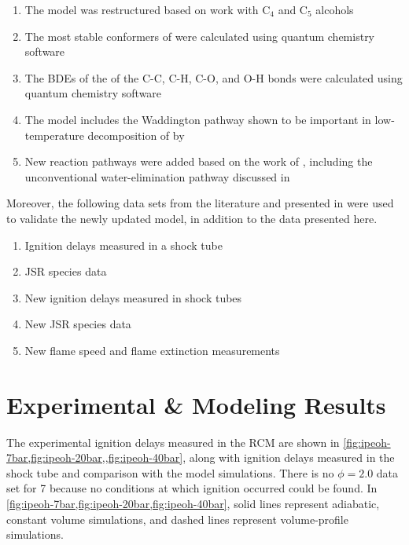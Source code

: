 \documentclass[../main.tex]{subfiles}
\begin{document}
\begin{enumerate}
\item The model was restructured based on work with C$_4$ and C$_5$
      alcohols \cite{Sarathy2012, Heufer2012a}
\item The most stable conformers of \iPeOH{} were calculated using
      quantum chemistry software
\item The BDEs of the of the C-C, C-H, C-O, and O-H bonds were calculated
      using quantum chemistry software
\item The model includes the Waddington pathway shown to be important in
      low-temperature decomposition of \iPeOH{} by \textcite{Welz2012}
\item New reaction pathways were added based on the work of \textcite{Welz2012,
      Welz2013}, including the unconventional water-elimination pathway discussed
      in \textcite{Welz2013}
\end{enumerate}

Moreover, the following data sets from the literature and presented in
\cite{Sarathy2013} were used to validate the newly updated model, in
addition to the data presented here.

\begin{enumerate}
\item Ignition delays measured in a shock tube \cite{Tang2013, Tsujimura2012}
\item JSR species data \cite{Dayma2011}
\item New ignition delays measured in shock tubes \cite{Sarathy2013}
\item New JSR species data \cite{Sarathy2013}
\item New flame speed and flame extinction measurements \cite{Sarathy2013}
\end{enumerate}

\section{Experimental \& Modeling Results}
\label{sec:ipeoh-results}

The experimental ignition delays measured in the RCM are shown in
\cref{fig:ipeoh-7bar,fig:ipeoh-20bar,,fig:ipeoh-40bar}, along with
ignition delays measured in the shock tube and comparison with
the model simulations. There is no $\phi=2.0$ data set for \SI{7}{\atmosphere}
because no conditions at which ignition occurred could be found.
In \cref{fig:ipeoh-7bar,fig:ipeoh-20bar,fig:ipeoh-40bar}, solid
lines represent adiabatic, constant volume simulations, and dashed
lines represent volume-profile simulations.
\end{document}
